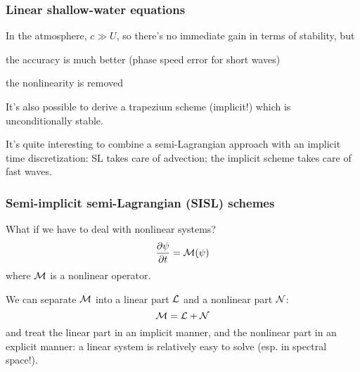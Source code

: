\documentclass[aspectratio=43,9pt]{beamer}
\begin{document}
%
%
\begin{frame}
	\frametitle{Linear shallow-water equations}
	\begin{myitemize}{3ex}
		\item In the atmosphere, $c \gg U$, so there's no immediate gain in terms of stability, but
			\begin{myitemize}{2ex}
				\item the accuracy is much better (phase speed error for short waves)
				\item the nonlinearity is removed
			\end{myitemize}
		\item It's also possible to derive a trapezium scheme (implicit!) which is unconditionally stable.
		\item It's quite interesting to combine a semi-Lagrangian approach with an implicit time discretization: SL takes care of advection; the implicit scheme takes care of fast waves.
	\end{myitemize}
\end{frame}
%
%
\begin{frame}
	\frametitle{Semi-implicit semi-Lagrangian (SISL) schemes}
	\begin{myitemize}{3ex}
		\item What if we have to deal with nonlinear systems?
			\begin{equation*}
				\frac{\partial \psi}{\partial t} = {\cal M} (\psi )
			\end{equation*}
			where $\cal M$ is a nonlinear operator.
	\pause
		\item We can separate $\cal M$ into a linear part $\cal L$ and a nonlinear part $\cal N$:
			\begin{equation*}
				{\cal M} = {\cal L} + {\cal N}
			\end{equation*}
			and treat the linear part in an implicit manner, and the nonlinear part in an explicit manner: a linear system is relatively easy to solve (esp. in spectral space!).
	\end{myitemize}
\end{frame}
%
%
\end{document}
